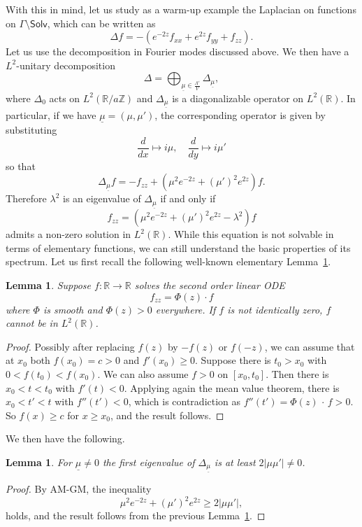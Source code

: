 \documentclass[11pt]{article}
\newtheorem{lemm}[theo]{Lemma}
\theoremstyle{definition}
\numberwithin{equation}{section}
\numberwithin{figure}{section}
\numberwithin{table}{section}
\newcommand{\Solv}{\mathsf{Solv}}
\begin{document}
With this in mind, let us study as a warm-up example the Laplacian on functions on $\Gamma\setminus\Solv$, which can be written as
\[
\Delta f=-\left(e^{-2z}f_{xx}+e^{2z}f_{yy}+f_{zz}\right).
\]
Let us use the decomposition in Fourier modes discussed above. We then have a $L^2$-unitary decomposition
\[
\Delta=\bigoplus_{\underline{\mu}\in \frac{\Lambda'}{V}} \Delta_{\underline{\mu}},
\]
where $\Delta_{0}$ acts on $L^2(\mathbb{R}/a\mathbb{Z})$ and $\Delta_{\underline{\mu}}$ is a diagonalizable operator on $L^2(\mathbb{R})$. In particular, if we have $\underline{\mu}=(\mu,\mu')$, the corresponding operator is given by substituting
\[
\frac{d}{dx}\mapsto i\mu,\quad\frac{d}{dy}\mapsto i\mu'
\]
so that
\[
\Delta_{\underline{\mu}} f=-f_{zz}+\left(\mu^2 e^{-2z}+(\mu')^2e^{2z}\right)f.
\]
Therefore $\lambda^2$ is an eigenvalue of $\Delta_{\underline{\mu}}$ if and only if
\[
f_{zz}=\left(\mu^2 e^{-2z}+(\mu')^2e^{2z}-\lambda^2\right)f
\]
admits a non-zero solution in $L^2(\mathbb{R})$. While this equation is not solvable in terms of elementary functions, we can still understand the basic properties of its spectrum. Let us first recall the following well-known elementary Lemma~\ref{keyODE}.

\begin{lemm}\label{keyODE}
Suppose $f:\mathbb{R}\rightarrow\mathbb{R}$ solves the second order linear ODE
\[
f_{zz}=\Phi(z)\cdot f
\]
where $\Phi$ is smooth and $\Phi(z)>0$ everywhere. If $f$ is not identically zero, $f$ cannot be in $L^2(\mathbb{R})$.
\end{lemm}

\begin{proof}
Possibly after replacing $f(z)$ by $-f(z)$ or $f(-z)$, we can assume that at $x_0$ both $f(x_0)=c>0$ and $f'(x_0)\geq0$. Suppose there is $t_0>x_0$ with $0<f(t_0)<f(x_0)$. We can also assume $f>0$ on $[x_0,t_0]$. Then there is $x_0<t<t_0$ with $f'(t)<0$. Applying again the mean value theorem, there is $x_0<t'<t$ with $f''(t')<0$, which is contradiction as $f''(t')=\Phi(z)\,\cdot\,f>0$. So $f(x)\geq c$ for $x\geq x_0$, and the result follows.
\end{proof}

We then have the following.

\begin{lemm}\label{eigenvalue}
For $\underline{\mu}\neq0$ the first eigenvalue of $\Delta_{\underline{\mu}}$ is at least $2|\mu\mu'|\neq0$.
\end{lemm}


\begin{proof}
By \textsc{AM-GM}, the inequality
\[
\mu^2 e^{-2z}+(\mu')^2e^{2z}\geq 2|\mu\mu'|,
\]
holds, and the result follows from the previous Lemma~\ref{eigenvalue}.
\end{proof}
\end{document}
